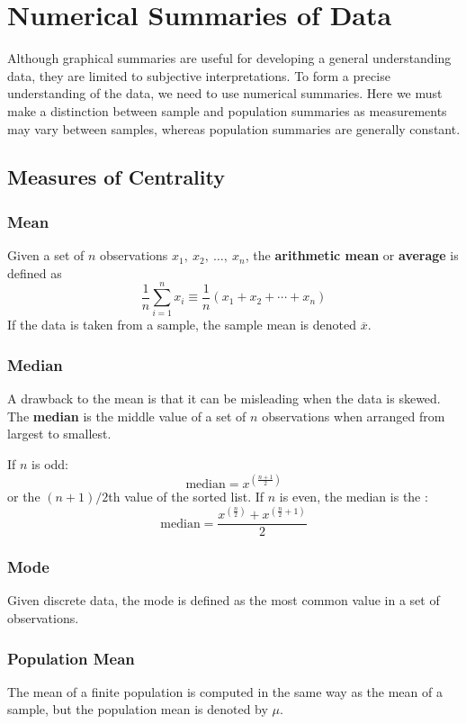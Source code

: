 \documentclass{article}
\begin{document}
\section{Numerical Summaries of Data}
Although graphical summaries are useful for developing a general understanding data,
they are limited to subjective interpretations. To form a precise understanding of the data, we need to use numerical summaries.
Here we must make a distinction between sample and population summaries as measurements may vary
between samples, whereas population summaries are generally constant.
\subsection{Measures of Centrality}
\subsubsection{Mean}
Given a set of \(n\) observations \(x_1,\: x_2,\: \ldots,\: x_n\), the \textbf{arithmetic mean}
or \textbf{average} is defined as
\begin{equation*}
    \frac{1}{n} \sum_{i = 1}^n x_i \equiv \frac{1}{n} \left( x_1 + x_2 + \cdots + x_n \right)
\end{equation*}
If the data is taken from a sample, the sample mean is denoted \(\overline{x}\).
\subsubsection{Median}
A drawback to the mean is that it can be misleading when the data is skewed.
The \textbf{median} is the middle value of a set of \(n\) observations when arranged
from largest to smallest.

If \(n\) is odd:
\begin{equation*}
    \text{median} = x^{\left( \frac{n + 1}{2} \right)}
\end{equation*}
or the \(\left( n + 1 \right) / 2\)th value of the sorted list.
If \(n\) is even, the median is the :
\begin{equation*}
    \text{median} = \frac{x^{\left( \frac{n}{2} \right)} + x^{\left( \frac{n}{2} + 1 \right)}}{2}
\end{equation*}
\subsubsection{Mode}
Given discrete data, the mode is defined as the most common value in a set of observations.
\subsubsection{Population Mean}
The mean of a finite population is computed in the same way as the mean of a sample,
but the population mean is denoted by \(\mu\).
\end{document}
